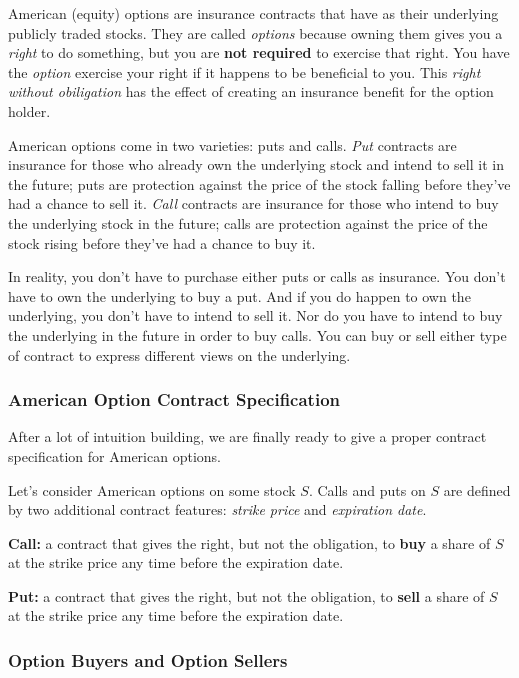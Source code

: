 \documentclass[11pt,]{krantz}
\begin{document}
American (equity) options are insurance contracts that have as their underlying publicly traded stocks. They are called \emph{options} because owning them gives you a \emph{right} to do something, but you are \textbf{not required} to exercise that right. You have the \emph{option} exercise your right if it happens to be beneficial to you. This \emph{right without obiligation} has the effect of creating an insurance benefit for the option holder.

American options come in two varieties: puts and calls. \emph{Put} contracts are insurance for those who already own the underlying stock and intend to sell it in the future; puts are protection against the price of the stock falling before they've had a chance to sell it. \emph{Call} contracts are insurance for those who intend to buy the underlying stock in the future; calls are protection against the price of the stock rising before they've had a chance to buy it.

In reality, you don't have to purchase either puts or calls as insurance. You don't have to own the underlying to buy a put. And if you do happen to own the underlying, you don't have to intend to sell it. Nor do you have to intend to buy the underlying in the future in order to buy calls. You can buy or sell either type of contract to express different views on the underlying.

\subsubsection*{American Option Contract Specification}\label{american-option-contract-specification}

After a lot of intuition building, we are finally ready to give a proper contract specification for American options.

Let's consider American options on some stock \(S\). Calls and puts on \(S\) are defined by two additional contract features: \emph{strike price} and \emph{expiration date}.

\textbf{Call:} a contract that gives the right, but not the obligation, to \textbf{buy} a share of \(S\) at the strike price any time before the expiration date.

\textbf{Put:} a contract that gives the right, but not the obligation, to \textbf{sell} a share of \(S\) at the strike price any time before the expiration date.

\subsubsection*{Option Buyers and Option Sellers}\label{option-buyers-and-option-sellers}
\end{document}
